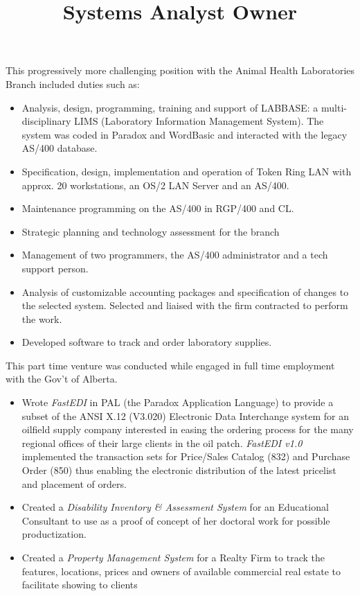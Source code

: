 \begin{resume}
\title{Systems Analyst}
\begin{position}
This progressively more challenging position with the Animal Health
Laboratories Branch included duties such as:
\begin{itemize}
\item Analysis, design, programming, training and support of LABBASE: 
        a multi-disciplinary LIMS (Laboratory Information Management System).  
	The system was coded in Paradox and WordBasic and
	interacted with the legacy AS/400 database.
\item Specification, design, implementation and operation of Token Ring LAN 
	with approx. 20 workstations, an OS/2 LAN Server and an AS/400.  
\item Maintenance programming on the AS/400 in RGP/400 and CL.  
\item Strategic planning and technology assessment for the branch 
\item Management of two programmers, the AS/400 administrator and a
	 tech support person.
\item Analysis of customizable accounting packages and specification 
	of changes to the selected system. Selected and liaised with 
	the firm contracted to perform the work.
\item Developed software to track and order laboratory supplies.
\end{itemize}
\end{position}


\title{ Owner }
\begin{position}
This part time venture was conducted while engaged in full time employment 
with the Gov't of Alberta.
\begin{itemize}
\item Wrote {\it FastEDI} in PAL (the Paradox Application Language)  to 
	provide a subset of the 
	ANSI X.12 (V3.020) Electronic Data Interchange system for an 
	oilfield supply company interested in easing the ordering process for
	the many regional offices of their large clients in the oil patch.  
	{\it FastEDI v1.0} implemented 
	the transaction sets for Price/Sales Catalog (832) and
	Purchase Order (850) thus enabling the electronic distribution 
	of the latest pricelist and placement of orders.
\item Created a {\it Disability Inventory \& Assessment System }
	for an Educational Consultant to use as a proof of concept of
	her doctoral work for possible productization.
\item Created a {\it Property Management System} for a Realty Firm to
	track the features, locations, prices and owners of 
	available commercial real estate to facilitate showing to clients
\end{itemize}
\end{position}



\end{resume}
